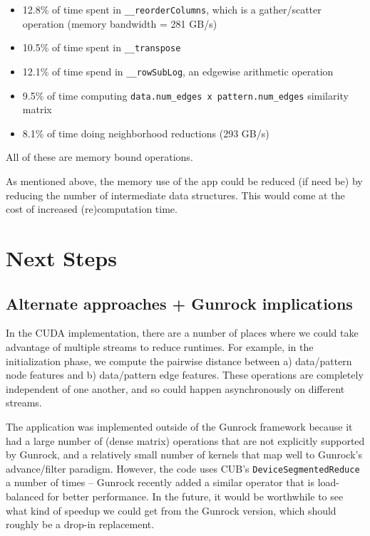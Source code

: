 \documentclass[10pt,oneside]{memoir}
\providecommand{\tightlist}{%
  \setlength{\itemsep}{0pt}\setlength{\parskip}{0pt}}
\begin{document}
\begin{itemize}
\tightlist
\item
  12.8\% of time spent in \texttt{\_\_reorderColumns}, which is a
  gather/scatter operation (memory bandwidth = 281 GB/s)
\item
  10.5\% of time spent in \texttt{\_\_transpose}
\item
  12.1\% of time spend in \texttt{\_\_rowSubLog}, an edgewise arithmetic
  operation
\item
  9.5\% of time computing
  \texttt{data.num\_edges\ x\ pattern.num\_edges} similarity matrix
\item
  8.1\% of time doing neighborhood reductions (293 GB/s)
\end{itemize}

All of these are memory bound operations.

As mentioned above, the memory use of the app could be reduced (if need
be) by reducing the number of intermediate data structures. This would
come at the cost of increased (re)computation time.

\hypertarget{next-steps}{%
\section{Next Steps}\label{next-steps}}

\hypertarget{alternate-approaches-gunrock-implications}{%
\subsection{Alternate approaches + Gunrock
implications}\label{alternate-approaches-gunrock-implications}}

In the CUDA implementation, there are a number of places where we could
take advantage of multiple streams to reduce runtimes. For example, in
the initialization phase, we compute the pairwise distance between a)
data/pattern node features and b) data/pattern edge features. These
operations are completely independent of one another, and so could
happen asynchronously on different streams.

The application was implemented outside of the Gunrock framework because
it had a large number of (dense matrix) operations that are not
explicitly supported by Gunrock, and a relatively small number of
kernels that map well to Gunrock's advance/filter paradigm. However, the
code uses CUB's \texttt{DeviceSegmentedReduce} a number of times --
Gunrock recently added a similar operator that is load-balanced for
better performance. In the future, it would be worthwhile to see what
kind of speedup we could get from the Gunrock version, which should
roughly be a drop-in replacement.
\end{document}
